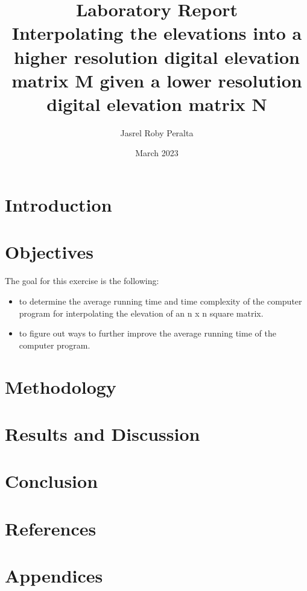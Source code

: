 \documentclass{article}
\title{%
\textbf{Laboratory Report} \\
\large Interpolating the elevations into a higher resolution digital elevation matrix M given a lower resolution digital elevation matrix N
}
\author{Jasrel Roby Peralta}
\date{March 2023}
\begin{document}
\maketitle

\section{Introduction}

\section{Objectives}
The goal for this exercise is the following:
\begin{itemize}
    \item to determine the average running time and time complexity of the computer program for interpolating the elevation of an n x n square matrix.
    \item to figure out ways to further improve the average running time of the computer program.
\end{itemize}
\section{Methodology}
\section{Results and Discussion}
\section{Conclusion}
\section{References}
\section{Appendices}
\end{document}
